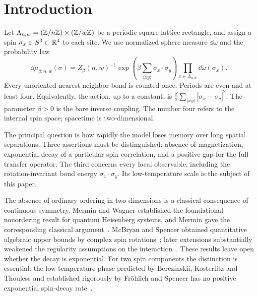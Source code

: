 \section{Introduction}
\label{sec:introduction}

Let $\Lambda_{n,w}=(\mathbb Z/n\mathbb Z)\times(\mathbb Z/w\mathbb Z)$ be a periodic square-lattice
rectangle, and assign a spin $\sigma_x\in S^3\subset\mathbb R^4$ to each site.
We use normalized sphere measure $\dd\omega$ and the probability law
\begin{equation}
\label{eq:measure}
 \dd\mu_{\beta;n,w}(\sigma)=Z_\beta(n,w)^{-1}
 \exp\left(\beta\sum_{\langle xy\rangle}\sigma_x\cdot\sigma_y\right)
 \prod_{x\in\Lambda_{n,w}}\dd\omega(\sigma_x).
\end{equation}
Every unoriented nearest-neighbor bond is counted once. Periods are
even and at least four. Equivalently, the action, up to a constant, is
$\frac\beta2\sum_{\langle xy\rangle}|\sigma_x-\sigma_y|^2$.
The parameter $\beta>0$ is the bare inverse coupling. The number four
refers to the internal spin space; spacetime is two-dimensional.

The principal question is how rapidly the model loses memory over long
spatial separations. Three assertions must be distinguished: absence of
magnetization, exponential decay of a particular spin correlation, and a
positive gap for the full transfer operator. The third concerns every
local observable, including the rotation-invariant bond energy
$\sigma_x\cdot\sigma_y$. Its low-temperature scale is the subject of this
paper.

The absence of ordinary ordering in two dimensions is a classical
consequence of continuous symmetry. Mermin and Wagner established the
foundational nonordering result for quantum Heisenberg systems, and
Mermin gave the corresponding classical argument~\cite{MW,Mermin1967}.
McBryan and Spencer obtained quantitative algebraic upper bounds by
complex spin rotations~\cite{McBryanSpencer}; later extensions substantially
weakened the regularity assumptions on the interaction~\cite{GagnebinVelenik}.
These results leave open whether the decay is exponential. For two spin
components the distinction is essential: the low-temperature phase
predicted by Berezinskii, Kosterlitz and Thouless and established rigorously
by Fr\"ohlich and Spencer has no positive exponential spin-decay
rate~\cite{Berezinskii,KosterlitzThouless,FS}.

